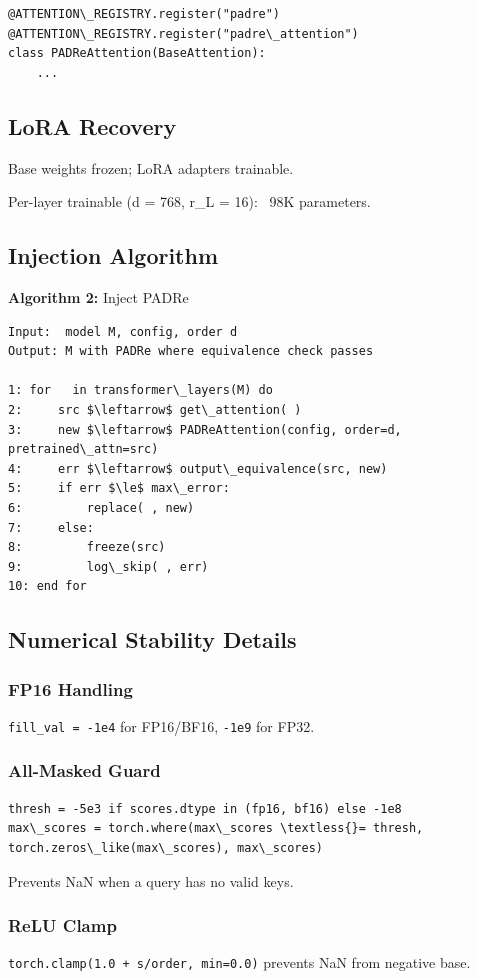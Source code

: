 \begin{lstlisting}
@ATTENTION\_REGISTRY.register("padre")
@ATTENTION\_REGISTRY.register("padre\_attention")
class PADReAttention(BaseAttention):
    ...
\end{lstlisting}

\subsection{LoRA Recovery}

Base weights frozen; LoRA adapters trainable.

Per-layer trainable (d = 768, r\_L = 16): ~98K parameters.

\subsection{Injection Algorithm}

\textbf{Algorithm 2:} Inject PADRe
\begin{lstlisting}
Input:  model M, config, order d
Output: M with PADRe where equivalence check passes

1: for   in transformer\_layers(M) do
2:     src $\leftarrow$ get\_attention( )
3:     new $\leftarrow$ PADReAttention(config, order=d, pretrained\_attn=src)
4:     err $\leftarrow$ output\_equivalence(src, new)
5:     if err $\le$ max\_error:
6:         replace( , new)
7:     else:
8:         freeze(src)
9:         log\_skip( , err)
10: end for
\end{lstlisting}

\subsection{Numerical Stability Details}

\subsubsection{FP16 Handling}

\texttt{fill\_val = -1e4} for FP16/BF16, \texttt{-1e9} for FP32.

\subsubsection{All-Masked Guard}

\begin{lstlisting}
thresh = -5e3 if scores.dtype in (fp16, bf16) else -1e8
max\_scores = torch.where(max\_scores \textless{}= thresh, torch.zeros\_like(max\_scores), max\_scores)
\end{lstlisting}

Prevents NaN when a query has no valid keys.

\subsubsection{ReLU Clamp}

\texttt{torch.clamp(1.0 + s/order, min=0.0)} prevents NaN from negative base.

